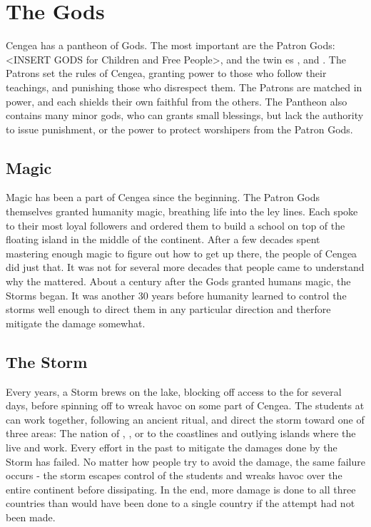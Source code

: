 \documentclass[blue]{GL2020}
\begin{document}
\section*{The Gods}
Cengea has a pantheon of Gods. The most important are the Patron Gods: <INSERT GODS for Children and Free People>, and the twin \cEbb{\God}es \cEbbFull{}, and \cFlowFull{}. The Patrons set the rules of Cengea, granting power to those who follow their teachings, and punishing those who disrespect them. The Patrons are matched in power, and each shields their own faithful from the others. The Pantheon also contains many minor gods, who can grants small blessings, but lack the authority to issue punishment, or the power to protect worshipers from the Patron Gods.

\subsection*{Magic}
Magic has been a part of Cengea since the beginning. The Patron Gods themselves granted humanity magic, breathing life into the ley lines. Each spoke to their most loyal followers and ordered them to build a school on top of the floating island in the middle of the continent. After a few decades spent mastering enough magic to figure out how to get up there, the people of Cengea did just that. It was not for several more decades that people came to understand why the \pSc{} mattered. About a century after the Gods granted humans magic, the Storms began. It was another 30 years before humanity learned to control the storms well enough to direct them in any particular direction and therfore mitigate the damage somewhat.

\subsection*{The Storm}
Every \pCycle{} years, a Storm brews on the lake, blocking off access to the \pSc{} for several days, before spinning off to wreak havoc on some part of Cengea. The students at \pSchool{} can work together, following an ancient ritual, and direct the storm toward one of three areas: The nation of \pFarm{}, \pTech{}, or to the coastlines and outlying islands where the \pShippies{} live and work. Every effort in the past to mitigate the damages done by the Storm has failed. No matter how people try to avoid the damage, the same failure occurs - the storm escapes control of the students and wreaks havoc over the entire continent before dissipating. In the end, more damage is done to all three countries than would have been done to a single country if the attempt had not been made. 
\end{document}

